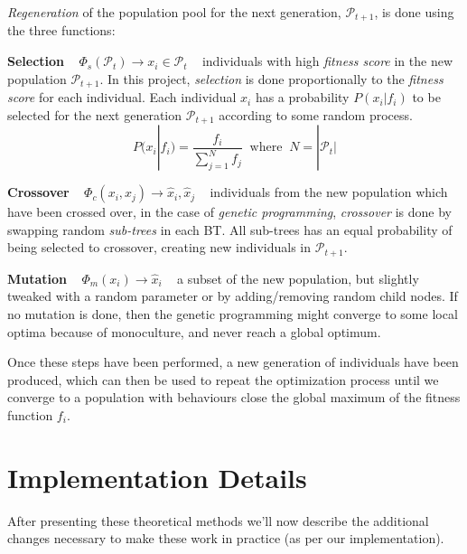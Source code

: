 \documentclass[a4paper, twocolumn]{article}
\begin{document}
	\emph{Regeneration} of the population pool for the next generation, \(\mathcal{P}_{t+1}\), is done using the three functions:

    \vspace{1em}

    \textbf{Selection} ~ \(\Phi_s(\mathcal{P}_t) \rightarrow x_i \in \mathcal{P}_t\) ~ individuals with high \emph{fitness score} in the new population \(\mathcal{P}_{t+1}\). In this project, \emph{selection} is done proportionally to the \emph{fitness score} for each individual. Each individual \(x_i\) has a probability \(P(x_i|f_i)\) to be selected for the next generation \(\mathcal{P}_{t+1}\) according to some random process.
    \begin{equation*}
        P(x_i|f_i) = \frac{f_i}{\sum_{j = 1}^{N}f_j} \; \; \text{where} \; \; N = |\mathcal{P}_t|
    \end{equation*}

    \textbf{Crossover} ~ \(\Phi_c(x_i,x_j) \rightarrow \hat{x}_i,\hat{x}_j\) ~ individuals from the new population which have been crossed over, in the case of \emph{genetic programming}, \emph{crossover} is done by swapping random \emph{sub-trees} in each BT. All sub-trees has an equal probability of being selected to crossover, creating new individuals in \(\mathcal{P}_{t+1}\).

    \vspace{1em}

    \textbf{Mutation} ~ \(\Phi_m(x_i) \rightarrow \hat{x}_i\) ~ a subset of the new population, but slightly tweaked with a random parameter or by adding/removing random child nodes. If no mutation is done, then the genetic programming might converge to some local optima because of monoculture, and never reach a global optimum.

    \vspace{1em}

    Once these steps have been performed, a new generation of individuals have been produced, which can then be used to repeat the optimization process until we converge to a population with behaviours close the global maximum of the fitness function \(f_i\).


    \section{Implementation Details} \label{sec:implementation_details}

        After presenting these theoretical methods we'll now describe the additional changes necessary to make these work in practice (as per our implementation).
\end{document}
